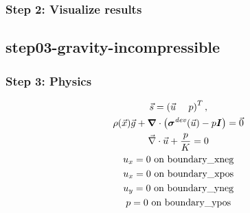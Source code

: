\documentclass[aspectratio=169]{beamer}
\begin{document}
\begin{frame}
  \frametitle{Step 2: Visualize results}

    
\end{frame}


\subsection{step03-gravity-incompressible}

\begin{frame}
  \frametitle{Step 3: Physics}
  \summary{}

  \begin{minipage}{0.3\textwidth}
    {\scriptsize
    \begin{gather*}
      \vec{s} = \left( \vec{u} \quad \ p \right)^T, \\
      \rho(\vec{x})\vec{g} + \bm{\nabla} \cdot \left(\bm{\sigma}^\mathit{dev}(\vec{u}) - p\bm{I}\right) = \vec{0} \\
      \vec{\nabla} \cdot \vec{u} + \frac{p}{K} = 0 \\
      u_x = 0 \text{ on boundary\_xneg} \\
      u_x = 0 \text{ on boundary\_xpos} \\
      u_y = 0 \text{ on boundary\_yneg} \\
      p = 0 \text{ on boundary\_ypos}
    \end{gather*}}
  \end{minipage}
  \hfill
  \begin{minipage}{0.67\textwidth}
  \end{minipage}
      
\end{frame}
\end{document}
